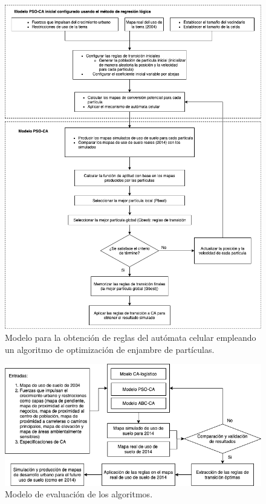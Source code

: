 \begin{figure}[H]
	\centering
	\includegraphics[width=\linewidth]{fig/particulas}
	\caption{Modelo para la obtención de reglas del autómata celular empleando un algoritmo de optimización de enjambre de partículas.}
	\label{fig:pso}
\end{figure}

\begin{figure}[H]
	\centering
	\includegraphics[width=\linewidth]{fig/evaluacion}
	\caption{Modelo de evaluación de los algoritmos.}
	\label{fig:evaluation}
\end{figure}


